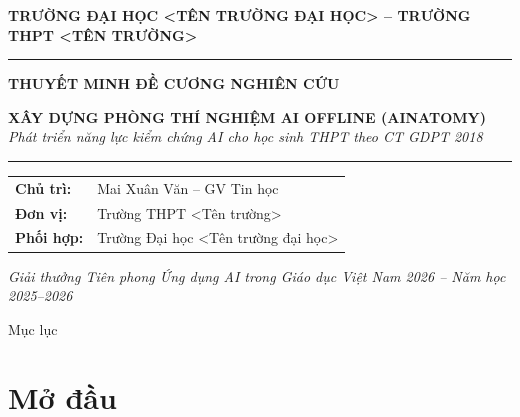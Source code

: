 \documentclass[10pt,xcolor=dvipsnames]{beamer}
\begin{document}
\begin{frame}
  \begin{center}
    \hfill
    
    \vspace{0.2cm}
    {\scriptsize \textbf{TRƯỜNG ĐẠI HỌC <TÊN TRƯỜNG ĐẠI HỌC> \quad -- \quad TRƯỜNG THPT <TÊN TRƯỜNG>}}
    
    \vspace{0.3cm}
    {\color{PrimaryBlue} \rule{0.9\textwidth}{0.4pt}}
    
    \vspace{0.2cm}
    {\large \textbf{\textcolor{PrimaryBlue}{THUYẾT MINH ĐỀ CƯƠNG NGHIÊN CỨU}}}
    
    \vspace{0.2cm}
    {\small \textbf{XÂY DỰNG PHÒNG THÍ NGHIỆM AI OFFLINE (AINATOMY)}\\[0.1em]
    \textit{Phát triển năng lực kiểm chứng AI cho học sinh THPT theo CT GDPT 2018}}
    
    \vspace{0.2cm}
    {\color{PrimaryBlue} \rule{0.9\textwidth}{0.4pt}}
    
    \vspace{0.2cm}
    {\small
    \begin{tabular}{ll}
      \textbf{Chủ trì:} & Mai Xuân Văn -- GV Tin học \\
      \textbf{Đơn vị:} & Trường THPT <Tên trường> \\
      \textbf{Phối hợp:} & Trường Đại học <Tên trường đại học> \\
    \end{tabular}
    }
    
    \vspace{0.2cm}
    {\scriptsize \textit{Giải thưởng Tiên phong Ứng dụng AI trong Giáo dục Việt Nam 2026 \quad -- \quad Năm học 2025--2026}}
  \end{center}
\end{frame}

\begin{frame}{Mục lục}
  \tableofcontents
\end{frame}

\section{Mở đầu}
\end{document}
